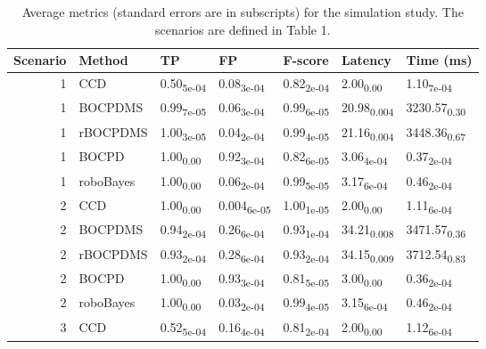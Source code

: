\begin{table}[H]
\centering
\caption{Average metrics (standard errors are in subscripts) for the simulation
study. The scenarios are defined in Table 1.\\} 
\label{tab:sim_results}
\begin{tabular}{rllllll}
  \hline
Scenario & Method & TP & FP & F-score & Latency & Time (ms) \\ 
  \hline
  1 & CCD & 0.50\textsubscript{5e-04} & 0.08\textsubscript{3e-04} & 0.82\textsubscript{2e-04} & 2.00\textsubscript{0.00} & 1.10\textsubscript{7e-04} \\ 
    1 & BOCPDMS & 0.99\textsubscript{7e-05} & 0.06\textsubscript{3e-04} & 0.99\textsubscript{6e-05} & 20.98\textsubscript{0.004} & 3230.57\textsubscript{0.30} \\ 
    1 & rBOCPDMS & 1.00\textsubscript{3e-05} & 0.04\textsubscript{2e-04} & 0.99\textsubscript{4e-05} & 21.16\textsubscript{0.004} & 3448.36\textsubscript{0.67} \\ 
    1 & BOCPD & 1.00\textsubscript{0.00} & 0.92\textsubscript{3e-04} & 0.82\textsubscript{6e-05} & 3.06\textsubscript{4e-04} & 0.37\textsubscript{2e-04} \\ 
    1 & roboBayes & 1.00\textsubscript{0.00} & 0.06\textsubscript{2e-04} & 0.99\textsubscript{5e-05} & 3.17\textsubscript{6e-04} & 0.46\textsubscript{2e-04} \\ 
   \hline
  2 & CCD & 1.00\textsubscript{0.00} & 0.004\textsubscript{6e-05} & 1.00\textsubscript{1e-05} & 2.00\textsubscript{0.00} & 1.11\textsubscript{6e-04} \\ 
    2 & BOCPDMS & 0.94\textsubscript{2e-04} & 0.26\textsubscript{6e-04} & 0.93\textsubscript{1e-04} & 34.21\textsubscript{0.008} & 3471.57\textsubscript{0.36} \\ 
    2 & rBOCPDMS & 0.93\textsubscript{2e-04} & 0.28\textsubscript{6e-04} & 0.93\textsubscript{2e-04} & 34.15\textsubscript{0.009} & 3712.54\textsubscript{0.83} \\ 
    2 & BOCPD & 1.00\textsubscript{0.00} & 0.93\textsubscript{3e-04} & 0.81\textsubscript{5e-05} & 3.00\textsubscript{0.00} & 0.36\textsubscript{2e-04} \\ 
    2 & roboBayes & 1.00\textsubscript{0.00} & 0.03\textsubscript{2e-04} & 0.99\textsubscript{4e-05} & 3.15\textsubscript{6e-04} & 0.46\textsubscript{2e-04} \\ 
   \hline
  3 & CCD & 0.52\textsubscript{5e-04} & 0.16\textsubscript{4e-04} & 0.81\textsubscript{2e-04} & 2.00\textsubscript{0.00} & 1.12\textsubscript{6e-04} \\ 

\end{tabular}
\end{table}

